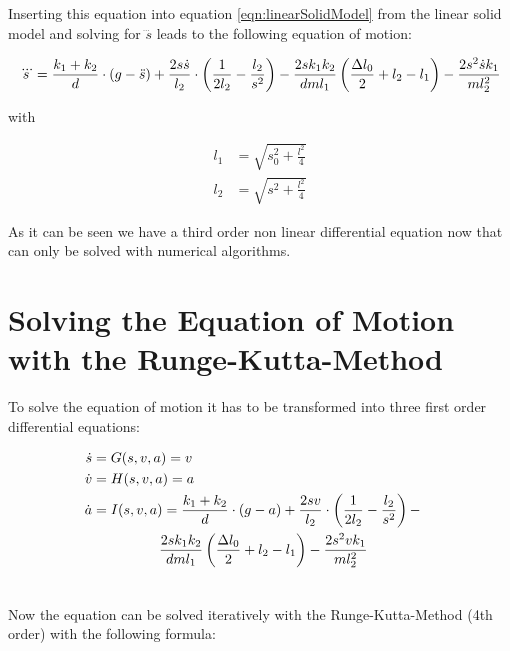 Inserting this equation into equation \ref{eqn:linearSolidModel} from the linear solid model and solving for $\dddot s$ leads to the following equation of motion:

\begin{equation}
\begin{split}
	\dddot s = \frac{k_1 + k_2}{d} \cdot (g - \ddot s) + \frac{2s\dot s}{l_2}\cdot \left(\frac{1}{2 l_2} - \frac{l_2}{s^2} \right) - \frac{2sk_1k_2}{dml_1} \left(\frac{\Delta l_0}{2} + l_2 - l_1\right) - \frac{2s^2\dot s k_1}{ml_2^2}	
\end{split}
\label{eqn:equationOfEmotion}
\end{equation}

with

\begin{align}
	l_1 &= \sqrt{s_0^2 + \frac{l^2}{4}} \\
	l_2 &= \sqrt{s^2 + \frac{l^2}{4}}
\end{align}

As it can be seen we have a third order non linear differential equation now that can only be solved with numerical algorithms.

\section{Solving the Equation of Motion with the Runge-Kutta-Method }

To solve the equation of motion it has to be transformed into three first order differential equations:

\begin{align}
	\dot s &=G(s,v,a) = v \\
	\dot v &= H(s,v,a) = a \\
	\dot a &\begin{multlined}[t] = I(s,v,a) =\insertForSmartphone{\\} \frac{k_1 + k_2}{d} \cdot (g - a) + \frac{2sv}{l_2}\cdot \left(\frac{1}{2 l_2} - \frac{l_2}{s^2} \right) - \\ \frac{2sk_1k_2}{dml_1} \left(\frac{\Delta l_0}{2} + l_2 - l_1\right) - \frac{2s^2v k_1}{ml_2^2} \\
	\end{multlined}
\end{align}

Now the equation can be solved iteratively with the Runge-Kutta-Method (4th order) with the following formula:

